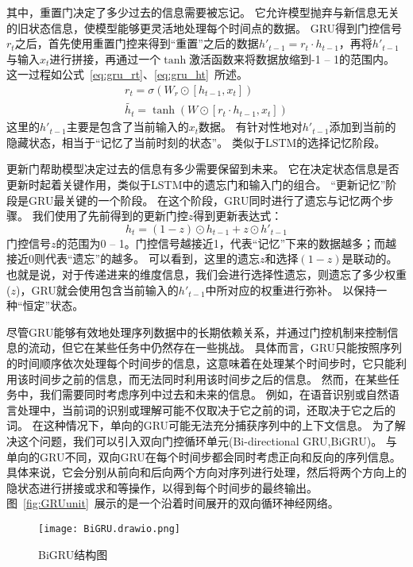 其中，重置门决定了多少过去的信息需要被忘记。
它允许模型抛弃与新信息无关的旧状态信息，使模型能够更灵活地处理每个时间点的数据。
GRU得到门控信号$r_t$之后，首先使用重置门控来得到“重置”之后的数据$h'_{t-1} = r_t \cdot h_{t-1}$，再将$h'_{t-1}$与输入$x_t$进行拼接，再通过一个$\tanh$激活函数来将数据放缩到-1 -- 1的范围内。
这一过程如公式~\ref{eq:gru_rt}、\ref{eq:gru_ht}~所述。
\begin{gather}
  r_t = σ(W_r \odot [h_{t-1},x_t]) \label{eq:gru_rt} \\
  \tilde{h_t} = \tanh(W \odot [r_t \cdot h_{t-1} , x_t]) \label{eq:gru_ht}
\end{gather}
这里的$h'_{t-1}$主要是包含了当前输入的$x_t$数据。
有针对性地对$h'_{t-1}$添加到当前的隐藏状态，相当于“记忆了当前时刻的状态”。
类似于LSTM的选择记忆阶段。


更新门帮助模型决定过去的信息有多少需要保留到未来。
它在决定状态信息是否更新时起着关键作用，类似于LSTM中的遗忘门和输入门的组合。
“更新记忆”阶段是GRU最关键的一个阶段。
在这个阶段，GRU同时进行了遗忘与记忆两个步骤。
我们使用了先前得到的更新门控$z$得到更新表达式： 
\begin{equation}
  \label{dq:gru_ht}
  h_t = (1-z) \odot h_{t-1} + z \odot h'_{t-1}
\end{equation}
门控信号$z$的范围为0 -- 1。门控信号越接近1，代表“记忆”下来的数据越多；而越接近0则代表“遗忘”的越多。
可以看到，这里的遗忘$z$和选择$(1-z)$是联动的。
也就是说，对于传递进来的维度信息，我们会进行选择性遗忘，则遗忘了多少权重($z$)，GRU就会使用包含当前输入的$h'_{t-1}$中所对应的权重进行弥补。
以保持一种“恒定”状态。


尽管GRU能够有效地处理序列数据中的长期依赖关系，并通过门控机制来控制信息的流动，但它在某些任务中仍然存在一些挑战。
具体而言，GRU只能按照序列的时间顺序依次处理每个时间步的信息，这意味着在处理某个时间步时，它只能利用该时间步之前的信息，而无法同时利用该时间步之后的信息。
然而，在某些任务中，我们需要同时考虑序列中过去和未来的信息。
例如，在语音识别或自然语言处理中，当前词的识别或理解可能不仅取决于它之前的词，还取决于它之后的词。
在这种情况下，单向的GRU可能无法充分捕获序列中的上下文信息。
为了解决这个问题，我们可以引入双向门控循环单元(Bi-directional GRU,BiGRU)。
与单向的GRU不同，双向GRU在每个时间步都会同时考虑正向和反向的序列信息。
具体来说，它会分别从前向和后向两个方向对序列进行处理，然后将两个方向上的隐状态进行拼接或求和等操作，以得到每个时间步的最终输出。
图~\ref{fig:GRUunit}~展示的是一个沿着时间展开的双向循环神经网络。
\begin{figure}[h]
  \centering
  \texttt{[image: BiGRU.drawio.png]}
  \caption{BiGRU结构图}
  \label{fig:BiGRU}
\end{figure}

